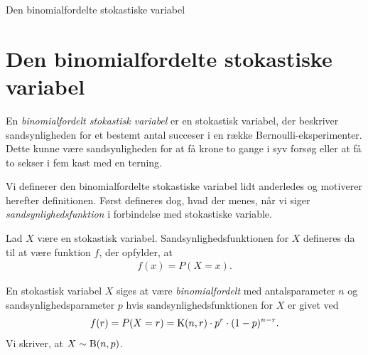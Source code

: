 
\begin{center}
\Huge
Den binomialfordelte stokastiske variabel
\end{center}
\section*{Den binomialfordelte stokastiske variabel}

En \textit{binomialfordelt stokastisk variabel} er en stokastisk variabel, der beskriver sandsynligheden for et bestemt antal succeser i en række Bernoulli-eksperimenter. Dette kunne være sandsynligheden for at få krone to gange i syv forsøg eller at få to sekser i fem kast med en terning. 

Vi definerer den binomialfordelte stokastiske variabel lidt anderledes og motiverer herefter definitionen. Først defineres dog, hvad der menes, når vi siger \textit{sandsynlighedsfunktion} i forbindelse med stokastiske variable. 
\begin{defn}[Sandsynlighedsfunktion]
	Lad $X$ være en stokastisk variabel. Sandsynlighedsfunktionen for $X$ defineres da til at være funktion $f$, der opfylder,  at
	\begin{align*}
		f(x) = P(X = x).
	\end{align*}
\end{defn}
\begin{defn}
	\label{def:bin}
	En stokastisk variabel $X$ siges at være \textit{binomialfordelt} med antalsparameter $n$ og sandsynlighedsparameter $p$ hvis sandsynlighedsfunktionen for $X$ er givet ved
	\begin{align*}
		f(r) = P(X = r) = \textnormal{K}(n,r)\cdot p^r\cdot (1-p)^{n-r}.
	\end{align*}
	Vi skriver, at $X \sim \textnormal{B}(n,p)$. 
\end{defn}

